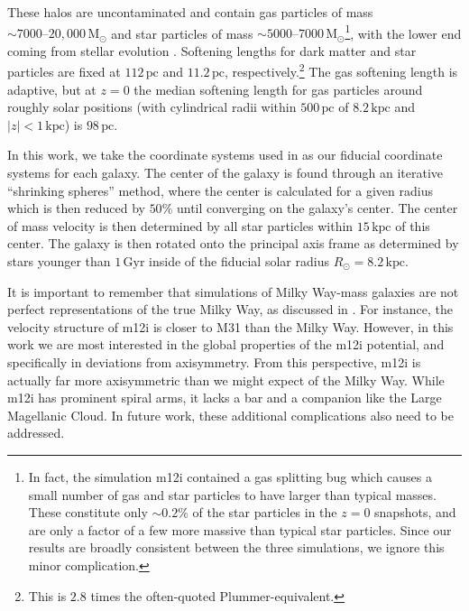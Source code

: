 \documentclass[twocolumn]{aastex62}
\newcommand{\Msun}{\text{M}_\odot}
\newcommand{\pc}{\text{pc}}
\newcommand{\kpc}{\text{kpc}}
\newcommand{\Gyr}{\text{Gyr}}
\newcommand{\abs}[1]{\left| #1 \right|}
\begin{document}
These halos are uncontaminated and contain gas particles of mass $\sim 7000
\text{--} 20,000\,\Msun$ and star particles of mass $\sim 5000 \text{--} 7000\,
\Msun$\footnote{In fact, the simulation m12i contained a gas
splitting bug which causes a small number of gas and star particles to have
larger than typical masses. These constitute only $\sim0.2\%$ of the star
particles in the $z=0$ snapshots, and are only a factor of a few more massive
than typical star particles. Since our results are broadly consistent between
the three simulations, we ignore this minor complication.}, with the lower end
coming from stellar evolution \citep{2018arXiv180610564S}. Softening lengths
for dark matter and star particles are fixed at $112\,\pc$ and $11.2\,\pc$,
respectively.\footnote{This is $2.8$ times the often-quoted
Plummer-equivalent.} The gas softening length is adaptive, but at $z=0$ the
median softening length for gas particles around roughly solar positions (with
cylindrical radii within $500\,\pc$ of $8.2\,\kpc$ and $\abs{z}<1\,\kpc$) is
$98\,\pc$.

In this work, we take the coordinate systems used in
\citet{2018arXiv180610564S} as our fiducial coordinate systems for each
galaxy. The center of the galaxy is found through an iterative ``shrinking
spheres'' method, where the center is calculated for a given radius which is
then reduced by $50\%$ until converging on the galaxy's center. The center of
mass velocity is then determined by all star particles within $15\,\kpc$ of
this center. The galaxy is then rotated onto the principal axis frame as
determined by stars younger than $1\,\Gyr$ inside of the fiducial solar radius
$R_{\odot} = 8.2\,\kpc$.


It is important to remember that simulations of Milky Way-mass galaxies are
not perfect representations of the true Milky Way, as discussed in
\citet{2018arXiv180610564S}. For instance, the velocity structure of m12i is
closer to M31 than the Milky Way. However, in this work we are most interested
in the global properties of the m12i potential, and specifically in deviations
from axisymmetry. From this perspective, m12i is actually far more
axisymmetric than we might expect of the Milky Way. While m12i has prominent
spiral arms, it lacks a bar and a companion like the Large Magellanic Cloud.
In future work, these additional complications also need to be addressed.
\end{document}
